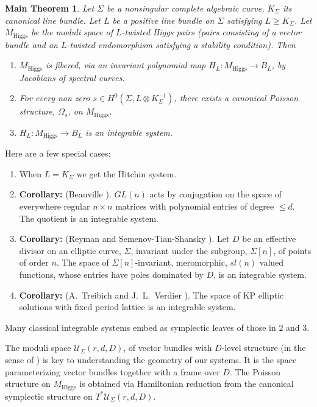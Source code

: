 \documentclass[12pt,a4paper,oneside,english]{smfart}
\newtheorem*{mainthm}{Main Theorem}
\theoremstyle{definition}
\theoremstyle{remark}
\newcommand{\Hig}{\mathrm{Higgs}}
\newcommand{\MH}{M_{\Hig}}
\newcommand{\cU}{\mathcal{U}}
\begin{document}
\begin{mainthm}\label{mainthm}
Let $\Sigma$ be a nonsingular complete algebraic curve, $K_{\Sigma}$ its canonical line bundle. Let $L$ be a positive line bundle on $\Sigma$ satisfying $L \geqslant K_{\Sigma}$. Let $\MH$ be the moduli space of $L$-twisted Higgs pairs (pairs consisting of a vector bundle and an $L$-twisted endomorphism satisfying a stability condition). Then
\begin{enumerate}
    \item $\MH$ is fibered, via an invariant polynomial map $H_L \colon \MH \to B_L$, by Jacobians of spectral curves.
    \item For every non zero $s \in H^0(\Sigma, L \otimes K_{\Sigma}^{-1})$, there exists a canonical Poisson structure, $\Omega_s$, on $\MH$.
    \item $H_L \colon \MH \to B_L$ is an integrable system.
\end{enumerate}
\end{mainthm}

Here are a few special cases:
\begin{enumerate}
    \item When $L = K_{\Sigma}$ we get the Hitchin system.
    \item \textbf{Corollary:} (Beauville \cite{B}). $GL(n)$ acts by conjugation on the space of everywhere regular $n \times n$ matrices with polynomial entries of degree $\leqslant d$. The quotient is an integrable system.
    \item \textbf{Corollary:} (Reyman and Semenov-Tian-Shansky \cite{R-S}). Let $D$ be an effective divisor on an elliptic curve, $\Sigma$, invariant under the subgroup, $\Sigma[n]$, of points of order $n$. The space of $\Sigma[n]$-invariant, meromorphic, $sl(n)$ valued functions, whose entries have poles dominated by $D$, is an integrable system.
    \item \textbf{Corollary:} (A.~Treibich and J.~L.~Verdier \cite{T-V}). The space of KP elliptic solutions with fixed period lattice is an integrable system.
\end{enumerate}

Many classical integrable systems embed as symplectic leaves of those in 2 and 3.

The moduli space $\cU_{\Sigma}(r, d, D)$, of vector bundles with $D$-level structure (in the sense of \cite{Se}) is key to understanding the geometry of our systems. It is the space parameterizing vector bundles together with a frame over $D$. The Poisson structure on $\MH$ is obtained via Hamiltonian reduction from the canonical symplectic structure on $T^*\cU_{\Sigma}(r, d, D)$.
\end{document}

